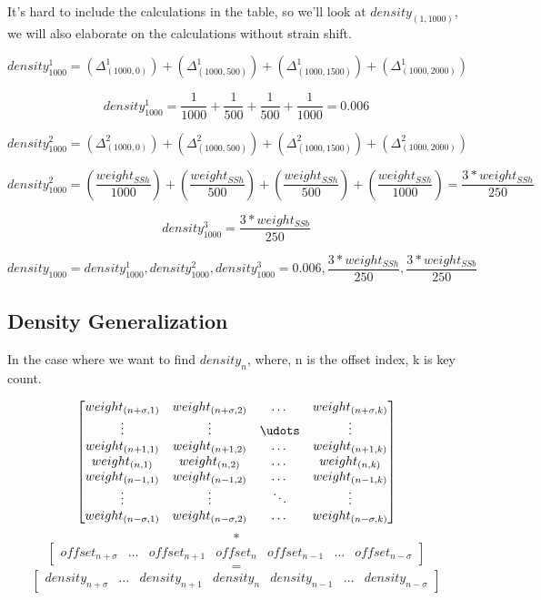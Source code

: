 It's hard to include the calculations in the table, so we'll look at $density_{(1,1000)}$, we will also elaborate on the calculations without strain shift.

$$density_{1000}^1 =
(\Delta_{(1000,0)}^{1}) +
(\Delta_{(1000,500)}^{1}) +
(\Delta_{(1000,1500)}^{1}) +
(\Delta_{(1000,2000)}^{1})$$

$$density_{1000}^1 =
\frac{1}{1000} +
\frac{1}{500} +
\frac{1}{500} +
\frac{1}{1000} = 0.006$$

$$density_{1000}^2 = 
(\Delta_{(1000,0)}^{2}) +
(\Delta_{(1000,500)}^{2}) +
(\Delta_{(1000,1500)}^{2}) +
(\Delta_{(1000,2000)}^{2})$$

$$ density_{1000}^2 = 
(\frac{weight_{SSh}}{1000}) +
(\frac{weight_{SSh}}{500}) +
(\frac{weight_{SSh}}{500}) +
(\frac{weight_{SSh}}{1000}) =
\frac{3 * weight_{SSh}}{250} $$

$$ density_{1000}^3 =
\frac{3 * weight_{SSb}}{250} $$

$$ density_{1000} =
density_{1000}^1, density_{1000}^2, density_{1000}^3 =
0.006,
\frac{3 * weight_{SSh}}{250}, \frac{3 * weight_{SSb}}{250} $$

\subsection{Density Generalization}

In the case where we want to find $density_n$, where, n is the offset index, k is key count.

\[ 	
\begin{bmatrix}
	weight_{(n+\sigma,1)} & weight_{(n+\sigma,2)} & \dots  & weight_{(n+\sigma,k)} \\
	\vdots & \vdots & \udots & \vdots \\
	weight_{(n+1,1)} & weight_{(n+1,2)} & \dots  & weight_{(n+1,k)} \\
	weight_{(n,1)} & weight_{(n,2)} & \dots  & weight_{(n,k)} \\
    weight_{(n-1,1)} & weight_{(n-1,2)} & \dots  & weight_{(n-1,k)} \\
    \vdots & \vdots & \ddots & \vdots \\
    weight_{(n-\sigma,1)} & weight_{(n-\sigma,2)} & \dots  & weight_{(n-\sigma,k)}
\end{bmatrix}
\]
$$ * $$
\[
\begin{bmatrix}
	offset_{n+\sigma} & \dots & offset_{n+1} & offset_{n} & offset_{n-1} & \dots & offset_{n-\sigma} 
\end{bmatrix}
\]
$$ = $$
\[
\begin{bmatrix}
	density_{n+\sigma} & \dots & density_{n+1} & density_{n} & density_{n-1} & \dots & density_{n-\sigma} 
\end{bmatrix}
\]

